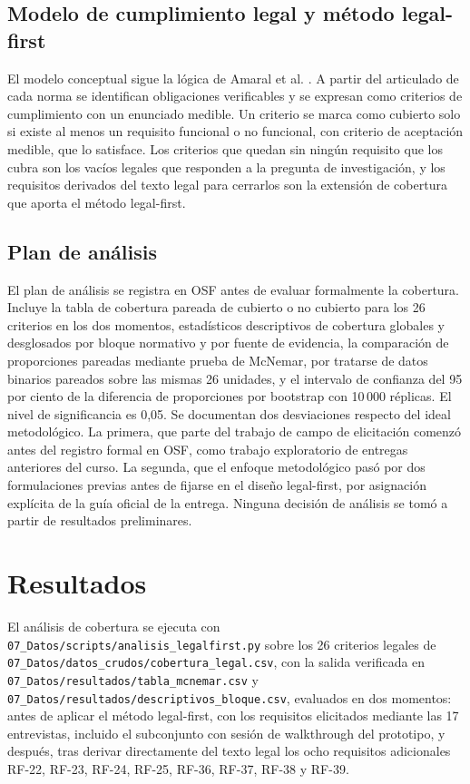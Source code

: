 \documentclass[pdflatex,sn-mathphys-num]{sn-jnl}
\begin{document}
\subsection{Modelo de cumplimiento legal y m\'etodo legal-first}

El modelo conceptual sigue la l\'ogica de Amaral et al. \cite{amaral2021}. A partir del articulado de cada norma se identifican obligaciones verificables y se expresan como criterios de cumplimiento con un enunciado medible. Un criterio se marca como cubierto solo si existe al menos un requisito funcional o no funcional, con criterio de aceptaci\'on medible, que lo satisface. Los criterios que quedan sin ning\'un requisito que los cubra son los vac\'ios legales que responden a la pregunta de investigaci\'on, y los requisitos derivados del texto legal para cerrarlos son la extensi\'on de cobertura que aporta el m\'etodo legal-first.

\subsection{Plan de an\'alisis}

El plan de an\'alisis se registra en OSF \cite{nosek2018} antes de evaluar formalmente la cobertura. Incluye la tabla de cobertura pareada de cubierto o no cubierto para los 26 criterios en los dos momentos, estad\'isticos descriptivos de cobertura globales y desglosados por bloque normativo y por fuente de evidencia, la comparaci\'on de proporciones pareadas mediante prueba de McNemar, por tratarse de datos binarios pareados sobre las mismas 26 unidades, y el intervalo de confianza del 95 por ciento de la diferencia de proporciones por bootstrap con 10\,000 r\'eplicas. El nivel de significancia es 0{,}05. Se documentan dos desviaciones respecto del ideal metodol\'ogico. La primera, que parte del trabajo de campo de elicitaci\'on comenz\'o antes del registro formal en OSF, como trabajo exploratorio de entregas anteriores del curso. La segunda, que el enfoque metodol\'ogico pas\'o por dos formulaciones previas antes de fijarse en el dise\~no legal-first, por asignaci\'on expl\'icita de la gu\'ia oficial de la entrega. Ninguna decisi\'on de an\'alisis se tom\'o a partir de resultados preliminares.

\section{Resultados}\label{sec:resultados}

El an\'alisis de cobertura se ejecuta con \texttt{07\_Datos/scripts/analisis\_legalfirst.py} sobre los 26 criterios legales de \texttt{07\_Datos/datos\_crudos/cobertura\_legal.csv}, con la salida verificada en \texttt{07\_Datos/resultados/tabla\_mcnemar.csv} y \texttt{07\_Datos/resultados/descriptivos\_bloque.csv}, evaluados en dos momentos: antes de aplicar el m\'etodo legal-first, con los requisitos elicitados mediante las 17 entrevistas, incluido el subconjunto con sesi\'on de walkthrough del prototipo, y despu\'es, tras derivar directamente del texto legal los ocho requisitos adicionales RF-22, RF-23, RF-24, RF-25, RF-36, RF-37, RF-38 y RF-39.
\end{document}
